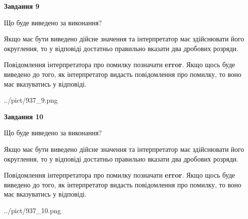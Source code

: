 \documentclass[12pt, ukrainian]{article}
\begin{document}
{\begin {Large}
{\begin {center}\textbf{Завдання 9}\end {center}}\par
Що буде виведено за виконання? \par

Якщо має бути виведено дійсне значення та інтерпретатор має здійснювати його округлення, 
то у відповіді достатньо правильно вказати два дробових розряди.

Повідомлення інтерпретатора про помилку позначати \textbf{error}.
Якщо щось буде виведено до того, як інтерпретатор видасть повідомлення про помилку, 
то воно має вказуватись у відповіді. \par

\begin{center}
	{../pict/937_9.png}
\end{center}
\newpage

{\begin {center}\textbf{Завдання 10}\end {center}}\par
Що буде виведено за виконання? \par

Якщо має бути виведено дійсне значення та інтерпретатор має здійснювати його округлення, 
то у відповіді достатньо правильно вказати два дробових розряди.

Повідомлення інтерпретатора про помилку позначати \textbf{error}.
Якщо щось буде виведено до того, як інтерпретатор видасть повідомлення про помилку, 
то воно має вказуватись у відповіді. \par

\begin{center}
	{../pict/937_10.png}
\end{center}
\newpage

\end {Large}}
\end{document}
